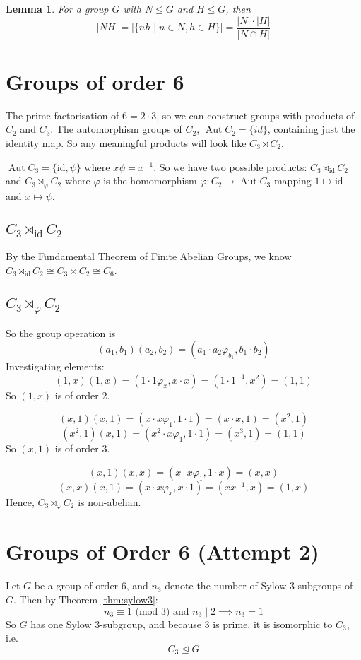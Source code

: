 \documentclass[a4paper, oneside, 12pt, draft]{article}
\newtheorem{lemma}[theorem]{Lemma}
\theoremstyle{definition}
\DeclareMathOperator{\Aut}{Aut}
\begin{document}
\begin{lemma}
\label{lem:setprodorder}
    For a group \(G\) with \(N \leqslant G\) and \(H \leqslant G\), then
    \[|NH| = |\{nh \mid n \in N, h \in H\}| = \frac{|N| \cdot |H|}{|N \cap H|}\]
\end{lemma}

\section{Groups of order 6}
The prime factorisation of \(6 = 2 \cdot 3\), so we can construct groups with
products of \(C_2\) and \(C_3\). The automorphism groups of \(C_2\),
\(\Aut{C_2} = \{id\}\), containing just the identity map. So any meaningful
products will look like \(C_3 \rtimes C_2\).

\(\Aut{C_3} = \{\text{id}, \psi\}\) where \(x\psi = x^{-1}\).
So we have two possible products: \(C_3 {\rtimes}_{\text{id}} C_2\) and \(C_3
{\rtimes}_{\varphi} C_2\) where \(\varphi\) is the homomorphism \(\varphi:C_2
\to \Aut{C_3}\) mapping \(1 \mapsto \text{id}\) and \(x \mapsto \psi\).

\subsection{\(C_3 \rtimes_\text{id} C_2\)}
By the Fundamental Theorem of Finite Abelian Groups, we know \( C_3
\rtimes_\text{id} C_2 \cong C_3 \times C_2 \cong C_6\).

\subsection{\(C_3 \rtimes_\varphi C_2\)}
So the group operation is
\[(a_1, b_1)(a_2, b_2) = (a_1\cdot a_2\varphi_{b_1}, b_1\cdot b_2)\]
Investigating elements:
\[(1,x)(1,x) = (1 \cdot 1\varphi_x, x \cdot x) = (1 \cdot 1^{-1}, x^2) = (1,
1)\]
So \((1, x)\) is of order 2.

\[(x, 1)(x, 1) = (x \cdot x\varphi_1, 1 \cdot 1) = (x \cdot x, 1) = (x^2, 1)\]
\[(x^2, 1)(x, 1) = (x^2 \cdot x\varphi_1, 1 \cdot 1) = (x^3, 1) = (1, 1)\]
So \((x, 1)\) is of order 3.

\[(x, 1)(x, x) = (x \cdot x\varphi_1, 1 \cdot x) = (x, x)\]
\[(x, x)(x, 1) = (x \cdot x\varphi_x, x \cdot 1) = (xx^{-1}, x) = (1, x)\]
Hence, \(C_3 \rtimes_\varphi C_2\) is non-abelian.

\section{Groups of Order 6 (Attempt 2)}
Let $G$ be a group of order 6, and $n_3$ denote the number of Sylow 3-subgroups
of $G$.
Then by Theorem \ref{thm:sylow3}:
\[n_3 \equiv 1 \text{ (mod 3) and } n_3 \mid 2 \implies n_3 = 1\]
So $G$ has one Sylow 3-subgroup, and because 3 is prime, it is isomorphic to
$C_3$, i.e.
\[C_3 \unlhd G\]
\end{document}
